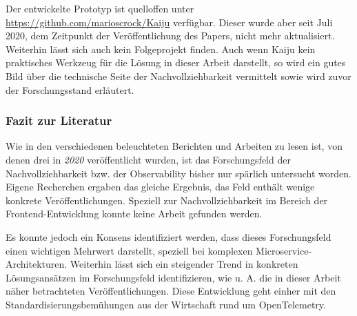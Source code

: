 Der entwickelte Prototyp ist quelloffen unter \url{https://github.com/marioscrock/Kaiju} verfügbar. Dieser wurde aber seit Juli 2020, dem Zeitpunkt der Veröffentlichung des Papers, nicht mehr aktualisiert. Weiterhin lässt sich auch kein Folgeprojekt finden. Auch wenn Kaiju kein praktisches Werkzeug für die Lösung in dieser Arbeit darstellt, so wird ein gutes Bild über die technische Seite der Nachvollziehbarkeit vermittelt sowie wird zuvor der Forschungsstand erläutert.

\subsubsection{Fazit zur Literatur}

Wie in den verschiedenen beleuchteten Berichten und Arbeiten zu lesen ist, von denen drei in \textit{2020} veröffentlicht wurden, ist das Forschungsfeld der Nachvollziehbarkeit bzw. der Observability bisher nur spärlich untersucht worden. Eigene Recherchen ergaben das gleiche Ergebnis, das Feld enthält wenige konkrete Veröffentlichungen. Speziell zur Nachvollziehbarkeit im Bereich der Frontend-Entwicklung konnte keine Arbeit gefunden werden.

Es konnte jedoch ein Konsens identifiziert werden, dass dieses Forschungsfeld einen wichtigen Mehrwert darstellt, speziell bei komplexen Microservice-Architekturen. Weiterhin lässt sich ein steigender Trend in konkreten Lösungsansätzen im Forschungsfeld identifizieren, wie u. A. die in dieser Arbeit näher betrachteten Veröffentlichungen. Diese Entwicklung geht einher mit den Standardisierungsbemühungen aus der Wirtschaft rund um OpenTelemetry.